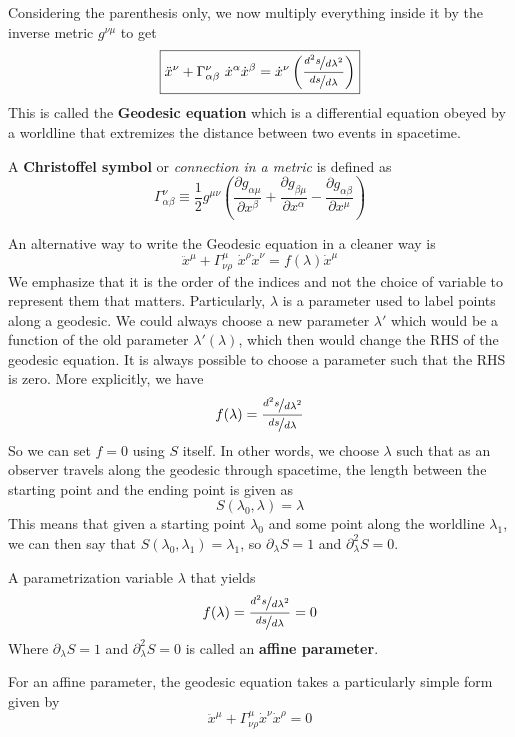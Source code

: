 \documentclass{article}
\begin{document}
 			Considering the parenthesis only, we now multiply everything inside it by the inverse metric $g^{\nu\mu}$ to get
 			\begin{equation}
 				\label{eq:GeodesicEquation}
 				\boxed{\ddot{x}^\nu + \Gamma^\nu_{\alpha\beta} \,\, \dot{x}^\alpha \dot{x}^\beta = \dot{x}^\nu \left(\frac{\nicefrac{d^2s}{d\lambda^2}}{\nicefrac{ds}{d\lambda}}\right)}
 			\end{equation}
 			This is called the \textbf{Geodesic equation} which is a differential equation obeyed by a worldline that extremizes the distance between two events in spacetime.
 			\begin{defn}
 				A \textbf{Christoffel symbol} or \textit{connection in a metric} is defined as 
 				\begin{equation}
 					\label{eq:ChristoffelSymbol}
 					\boxed{
 						\Gamma_{\alpha\beta}^\nu \equiv \frac12 g^{\mu\nu} \left( \frac{\partial g_{\alpha\mu}}{\partial x^\beta} + \frac{\partial g_{\beta\mu}}{\partial x^\alpha} - \frac{\partial g_{\alpha\beta}}{\partial x^\mu} \right)
 					}
 				\end{equation}
 			\end{defn}
 			\noindent
 			An alternative way to write the Geodesic equation in a cleaner way is
 			\begin{equation}
 				\label{eq:CleanGeodesic}
 				\boxed{\ddot{x}^\mu + \Gamma_{\nu\rho}^\mu \,\, \dot{x}^\rho \dot{x}^\nu = f(\lambda) \dot{x}^\mu}
 			\end{equation}
 			We emphasize that it is the order of the indices and not the choice of variable to represent them that matters. Particularly, $\lambda$ is a parameter used to label points along a geodesic. We could always choose a new parameter $\lambda'$ which would be a function of the old parameter $\lambda'(\lambda)$, which then would change the RHS of the geodesic equation. It is always possible to choose a parameter such that the RHS is zero. More explicitly, we have
 			$$ f(\lambda) = \frac{\nicefrac{d^2s}{d\lambda^2}}{\nicefrac{ds}{d\lambda}} $$
 			So we can set $f=0$ using $S$ itself. In other words, we choose $\lambda$ such that as an observer travels along the geodesic through spacetime, the length between the starting point and the ending point is given as
 			$$ S\left(\lambda_0, \lambda \right) = \lambda$$
 			This means that given a starting point $\lambda_0$ and some point along the worldline $\lambda_1$, we can then say that $S\left(\lambda_0, \lambda_1 \right) = \lambda_1$, so $\partial_\lambda S = 1$ and $\partial_{\lambda}^2 S = 0$.
 			\begin{defn}
 				A parametrization variable $\lambda$ that yields $$f(\lambda) = \frac{\nicefrac{d^2s}{d\lambda^2}}{\nicefrac{ds}{d\lambda}}  = 0$$
 				Where $\partial_\lambda S = 1$ and $\partial_{\lambda}^2 S = 0$ is called an \textbf{affine parameter}.
 			\end{defn}
 			For an affine parameter, the geodesic equation takes a particularly simple form given by
 			\begin{equation}
 				\label{eq:AffineGeodesic}
 				\boxed{\ddot{x}^\mu + \Gamma^\mu_{\nu\rho} \dot{x}^\nu \dot{x}^\rho = 0}
 			\end{equation}
 		
\end{document}
